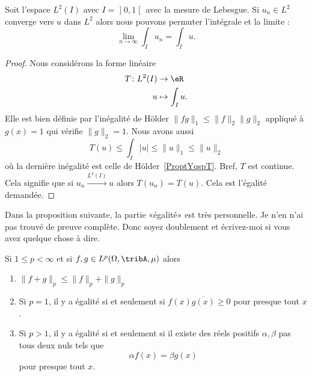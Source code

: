 \begin{corollary}        \label{CORooIIEAooNmbkTo}
	Soit l'espace \( L^2(I)\) avec \( I=\mathopen] 0 , 1 \mathclose[\) avec la mesure de Lebesgue. Si \( u_n\in L^2\) converge vers \( u\) dans \( L^2\) alors nous pouvons permuter l'intégrale et la limite :
	\begin{equation}
		\lim_{n\to \infty} \int_Iu_n=\int_Iu.
	\end{equation}
\end{corollary}

\begin{proof}
	Nous considérons la forme linéaire
	\begin{equation}
		\begin{aligned}
			T\colon L^2(I) & \to \eR           \\
			u              & \mapsto \int_Iu .
		\end{aligned}
	\end{equation}
	Elle est bien définie par l'inégalité de Hölder \( \| fg \|_1\leq \| f \|_2\| g \|_2\) appliqué à \( g(x)=1\) qui vérifie \( \| g \|_2=1\). Nous avons aussi
	\begin{equation}
		T(u)\leq \int_I| u |\leq \| u \|_1\leq\| u \|_2
	\end{equation}
	où la dernière inégalité est celle de Hölder~\ref{ProptYqspT}. Bref, \( T\) est continue. Cela signifie que si \( u_n\stackrel{L^2(I)}{\longrightarrow}u\) alors \( T(u_n)=T(u)\). Cela est l'égalité demandée.
\end{proof}

\begin{probleme}
	Dans la proposition suivante, la partie «égalité» est très personnelle. Je n'en n'ai pas trouvé de preuve complète. Donc soyez doublement  et écrivez-moi si vous avez quelque chose à dire.
\end{probleme}

\begin{proposition}     \label{PropInegMinkKUpRHg}
	Si \( 1\leq p<\infty\) et si \( f,g\in L^p(\Omega,\tribA,\mu)\) alors
	\begin{enumerate}
		\item   \label{ItemDHukLJi}
		      \( \| f+g \|_p\leq \| f \|_p+\| g \|_p\)
		\item       \label{ITEMooGRXBooMLRMww}
		      Si \( p=1\), il y a égalité si et seulement si \( f(x)\overline{ g(x) }\geq 0\) pour presque tout \( x\).
		\item       \label{ITEMooQCSHooNUDwtM}
		      Si \( p>1\), il y a égalité si et seulement si il existe des réels positifs \( \alpha,\beta\) pas tous deux nuls tels que
		      \begin{equation}
			      \alpha f(x)=\beta g(x)
		      \end{equation}
		      pour presque tout \( x\).
	\end{enumerate}
\end{proposition}

